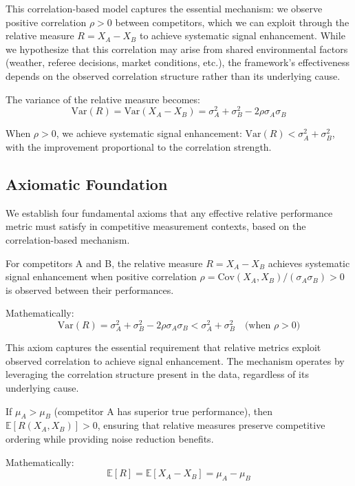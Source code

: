 This correlation-based model captures the essential mechanism: we observe positive correlation $\rho > 0$ between competitors, which we can exploit through the relative measure $R = X_A - X_B$ to achieve systematic signal enhancement. While we hypothesize that this correlation may arise from shared environmental factors (weather, referee decisions, market conditions, etc.), the framework's effectiveness depends on the observed correlation structure rather than its underlying cause.

The variance of the relative measure becomes:
\begin{equation}
\text{Var}(R) = \text{Var}(X_A - X_B) = \sigma_A^2 + \sigma_B^2 - 2\rho\sigma_A\sigma_B \label{eq:relative_variance}
\end{equation}

When $\rho > 0$, we achieve systematic signal enhancement: $\text{Var}(R) < \sigma_A^2 + \sigma_B^2$, with the improvement proportional to the correlation strength.

\subsection{Axiomatic Foundation}

We establish four fundamental axioms that any effective relative performance metric must satisfy in competitive measurement contexts, based on the correlation-based mechanism.

\begin{axiom}
For competitors A and B, the relative measure $R = X_A - X_B$ achieves systematic signal enhancement when positive correlation $\rho = \text{Cov}(X_A, X_B)/(\sigma_A \sigma_B) > 0$ is observed between their performances.

Mathematically:
$$\text{Var}(R) = \sigma_A^2 + \sigma_B^2 - 2\rho\sigma_A \sigma_B < \sigma_A^2 + \sigma_B^2 \quad \text{(when } \rho > 0\text{)}$$
\end{axiom}

This axiom captures the essential requirement that relative metrics exploit observed correlation to achieve signal enhancement. The mechanism operates by leveraging the correlation structure present in the data, regardless of its underlying cause.

\begin{axiom} 
If $\mu_A > \mu_B$ (competitor A has superior true performance), then $\mathbb{E}[R(X_A, X_B)] > 0$, ensuring that relative measures preserve competitive ordering while providing noise reduction benefits.

Mathematically:
$$\mathbb{E}[R] = \mathbb{E}[X_A - X_B] = \mu_A - \mu_B$$
\end{axiom}

